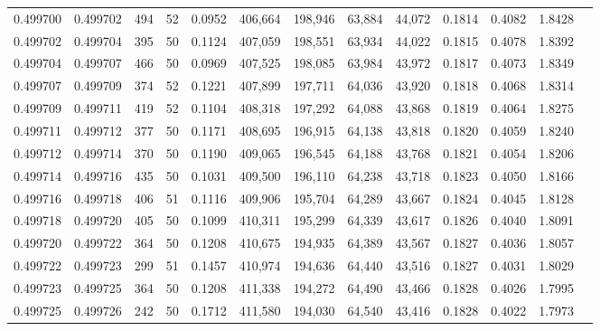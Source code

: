\begin{tabular}{rrrrrrrrrrrrr}
0.499700 & 0.499702 & 494 &  52 &                                     0.0952 & 406,664 & 198,946 &  63,884 &  44,072 & 0.1814 & 0.4082 & 1.8428 \\
0.499702 & 0.499704 & 395 &  50 &                                     0.1124 & 407,059 & 198,551 &  63,934 &  44,022 & 0.1815 & 0.4078 & 1.8392 \\
0.499704 & 0.499707 & 466 &  50 &                                     0.0969 & 407,525 & 198,085 &  63,984 &  43,972 & 0.1817 & 0.4073 & 1.8349 \\
0.499707 & 0.499709 & 374 &  52 &                                     0.1221 & 407,899 & 197,711 &  64,036 &  43,920 & 0.1818 & 0.4068 & 1.8314 \\
0.499709 & 0.499711 & 419 &  52 &                                     0.1104 & 408,318 & 197,292 &  64,088 &  43,868 & 0.1819 & 0.4064 & 1.8275 \\
0.499711 & 0.499712 & 377 &  50 &                                     0.1171 & 408,695 & 196,915 &  64,138 &  43,818 & 0.1820 & 0.4059 & 1.8240 \\
0.499712 & 0.499714 & 370 &  50 &                                     0.1190 & 409,065 & 196,545 &  64,188 &  43,768 & 0.1821 & 0.4054 & 1.8206 \\
0.499714 & 0.499716 & 435 &  50 &                                     0.1031 & 409,500 & 196,110 &  64,238 &  43,718 & 0.1823 & 0.4050 & 1.8166 \\
0.499716 & 0.499718 & 406 &  51 &                                     0.1116 & 409,906 & 195,704 &  64,289 &  43,667 & 0.1824 & 0.4045 & 1.8128 \\
0.499718 & 0.499720 & 405 &  50 &                                     0.1099 & 410,311 & 195,299 &  64,339 &  43,617 & 0.1826 & 0.4040 & 1.8091 \\
0.499720 & 0.499722 & 364 &  50 &                                     0.1208 & 410,675 & 194,935 &  64,389 &  43,567 & 0.1827 & 0.4036 & 1.8057 \\
0.499722 & 0.499723 & 299 &  51 &                                     0.1457 & 410,974 & 194,636 &  64,440 &  43,516 & 0.1827 & 0.4031 & 1.8029 \\
0.499723 & 0.499725 & 364 &  50 &                                     0.1208 & 411,338 & 194,272 &  64,490 &  43,466 & 0.1828 & 0.4026 & 1.7995 \\
0.499725 & 0.499726 & 242 &  50 &                                     0.1712 & 411,580 & 194,030 &  64,540 &  43,416 & 0.1828 & 0.4022 & 1.7973 \\

\end{tabular}
